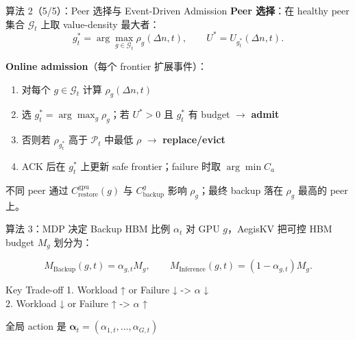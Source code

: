 \documentclass[aspectratio=43]{beamer}
\begin{document}
\begin{frame}{算法 2（5/5）：Peer 选择与 Event-Driven Admission}
  \small
  \textbf{Peer 选择}：在 healthy peer 集合 $\mathcal{G}_t$ 上取 value-density 最大者：
  \[
    g_t^* = \arg\max_{g \in \mathcal{G}_t} \rho_g(\Delta n,t),
    \qquad
    U^* = U_{g_t^*}(\Delta n,t).
  \]

  \vspace{0.08cm}
  \textbf{Online admission}（每个 frontier 扩展事件）：
  \begin{enumerate}
    \item 对每个 $g \in \mathcal{G}_t$ 计算 $\rho_g(\Delta n,t)$
    \item 选 $g_t^* = \arg\max_g \rho_g$；若 $U^*>0$ 且 $g_t^*$ 有 budget $\rightarrow$ \textbf{admit}
    \item 否则若 $\rho_{g_t^*}$ 高于 $\mathcal{P}_t$ 中最低 $\rho$ $\rightarrow$ \textbf{replace/evict}
    \item ACK 后在 $g_t^*$ 上更新 safe frontier；failure 时取 $\arg\min C_a$
  \end{enumerate}

  \vspace{0.06cm}
  \footnotesize
  不同 peer 通过 $C_{\mathrm{restore}}^{\mathrm{gpu}}(g)$ 与 $C_{\mathrm{backup}}^g$ 影响 $\rho_g$；最终 backup 落在 $\rho_g$ 最高的 peer 上。
\end{frame}

\begin{frame}{算法 3：MDP 决定 Backup HBM 比例 $\alpha_t$}
  \small
  对 GPU $g$，AegisKV 把可控 HBM budget $M_g$ 划分为：

  \vspace{0.10cm}
  \[
    M_{\mathrm{Backup}}(g,t) = \alpha_{g,t} M_g,
    \qquad
    M_{\mathrm{Inference}}(g,t) = (1-\alpha_{g,t})M_g .
  \]

  \vspace{0.10cm}
  \begin{block}{Key Trade-off}
    1. Workload ↑ or Failure ↓ -> $\alpha$ ↓ \\
    2. Workload ↓ or Failure ↑ -> $\alpha$ ↑
  \end{block}

  \vspace{0.10cm}
  \footnotesize
  全局 action 是 $\boldsymbol{\alpha}_t=(\alpha_{1,t},\ldots,\alpha_{G,t})$
\end{frame}
\end{document}
